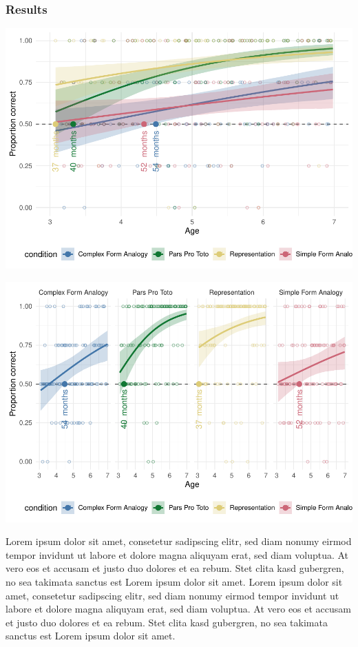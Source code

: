 \documentclass[
  man]{apa6}
\begin{document}
\subsubsection{Results}\label{results}

\includegraphics{symlit_rep_manuscript_files/figure-latex/S1_bayes_plot_no_facets-1.pdf}

\includegraphics{symlit_rep_manuscript_files/figure-latex/S1_bayes_plot-1.pdf}

Lorem ipsum dolor sit amet, consetetur sadipscing elitr, sed diam nonumy eirmod tempor invidunt ut labore et dolore magna aliquyam erat, sed diam voluptua. At vero eos et accusam et justo duo dolores et ea rebum. Stet clita kasd gubergren, no sea takimata sanctus est Lorem ipsum dolor sit amet. Lorem ipsum dolor sit amet, consetetur sadipscing elitr, sed diam nonumy eirmod tempor invidunt ut labore et dolore magna aliquyam erat, sed diam voluptua. At vero eos et accusam et justo duo dolores et ea rebum. Stet clita kasd gubergren, no sea takimata sanctus est Lorem ipsum dolor sit amet.
\end{document}
